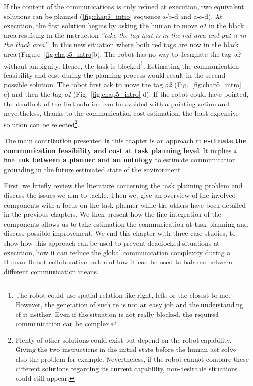 If the content of the communications is only refined at execution, two equivalent solutions can be planned (\ref{fig:chap5_intro} sequence a-b-d and a-c-d). At execution, the first solution begins by asking the human to move \textit{o1} in the black area resulting in the instruction \textit{``take the tag that is in the red area and put it in the black area''}. In this new situation where both red tags are now in the black area (Figure~\ref{fig:chap5_intro}b). The robot has no way to designate the tag \textit{o2} without ambiguity. Hence, the task is blocked\footnote{The robot could use spatial relation like right, left, or the closest to me. However, the generation of such \acrshort{re} is not an easy job and the understanding of it neither. Even if the situation is not really blocked, the required communication can be complex. }. Estimating the communication feasibility and cost during the planning process would result in the second possible solution. The robot first ask to move the tag \textit{o2} (Fig.~\ref{fig:chap5_intro} c) and then the tag \textit{o1} (Fig.~\ref{fig:chap5_intro} d). If the robot could have pointed, the deadlock of the first solution can be avoided with a pointing action and nevertheless, thanks to the communication cost estimation, the least expensive solution can be selected\footnote{Plenty of other solutions could exist but depend on the robot capability. Giving the two instructions in the initial state before the human act solve also the problem for example. Nevertheless, if the robot cannot compare these different solutions regarding its current capability, non-desirable situations could still appear.}.

The main contribution presented in this chapter is an approach to \textbf{estimate the communication feasibility and cost at task planning level}. It implies a fine \textbf{link between a planner and an ontology} to estimate communication grounding in the future estimated state of the environment.

First, we briefly review the literature concerning the task planning problem and discuss the issues we aim to tackle. Then we, give an overview of the involved components with a focus on the task planner while the others have been detailed in the previous chapters. We then present how the fine integration of the components allows us to take estimation the communication at task planning and discuss possible improvement. We end this chapter with three case studies, to show how this approach can be used to prevent deadlocked situations at execution, how it can reduce the global communication complexity during a Human-Robot collaborative task and how it can be used to balance between different communication means.

